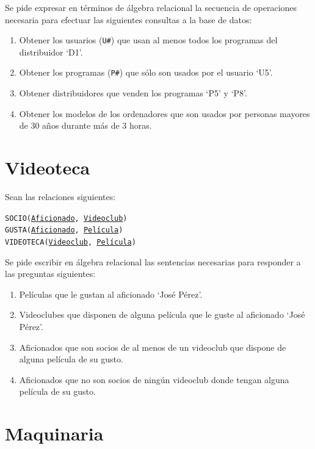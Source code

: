\documentclass[a4paper]{article}
\begin{document}
Se pide expresar en términos de álgebra relacional la secuencia de operaciones necesaria para efectuar las siguientes consultas a la base de datos:

\begin{enumerate}
    \item Obtener los usuarios (\texttt{U\#}) que usan al menos todos los programas del distribuidor `D1'.
    \item Obtener los programas (\texttt{P\#}) que sólo son usados por el usuario `U5'.
    \item Obtener distribuidores que venden los programas `P5' y `P8'.
    \item Obtener los modelos de los ordenadores que son usados por personas mayores de 30 años durante más de 3 horas.
\end{enumerate}

\section{Videoteca}

Sean las relaciones siguientes:

\begin{addmargin}[1.5em]{0em}
    \texttt{SOCIO(\underline{Aficionado}, \underline{Videoclub})}\\
    \texttt{GUSTA(\underline{Aficionado}, \underline{Película})}\\
    \texttt{VIDEOTECA(\underline{Videoclub}, \underline{Película})}
\end{addmargin}

Se pide escribir en álgebra relacional las sentencias necesarias para responder a las preguntas siguientes:

\begin{enumerate}
    \item Películas que le gustan al aficionado `José Pérez'.
    \item Videoclubes que disponen de alguna película que le guste al aficionado `José Pérez'.
    \item Aficionados que son socios de al menos de un videoclub que dispone de alguna película de su gusto.
    \item Aficionados que no son socios de ningún videoclub donde tengan alguna película de su gusto.
\end{enumerate}

\section{Maquinaria}
\end{document}
